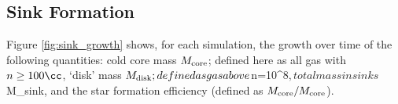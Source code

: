 \subsection{Sink Formation}
\label{subsec:sink_formation}

Figure \ref{fig:sink_growth} shows, for each simulation, the growth over time of the following quantities: cold core mass $M_{\rm \small core}$; defined here as all gas with $n \geq 100\cc$, `disk' mass $M_{\rm \small disk}; defined as gas above $n=10^8\cc$, total mass in sinks $M_{\rm \small sink}, and the star formation efficiency (defined as $M_{\rm \small core}/M_{\rm \small core}$).
